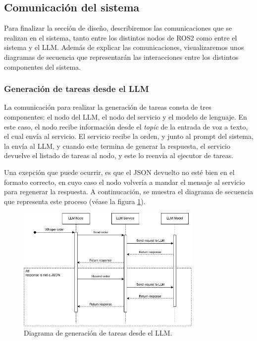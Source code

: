 \documentclass[../main.tex]{subfiles}
\begin{document}
\subsection{Comunicación del sistema}
Para finalizar la sección de diseño, describiremos las comunicaciones que se realizan en el sistema, tanto entre los distintos nodos de ROS2 como entre el sistema y el LLM. Además de explicar las comunicaciones, visualizaremos unos diagramas de secuencia que representarán las interacciones entre los distintos componentes del sistema.

\subsubsection{Generación de tareas desde el LLM}
La comunicación para realizar la generación de tareas consta de tres componentes: el nodo del LLM, el nodo del servicio y el modelo de lenguaje. En este caso, el nodo recibe información desde el \textit{topic} de la entrada de voz a texto, el cual envía al servicio. El servicio recibe la orden, y junto al prompt del sistema, la envía al LLM, y cuando este
termina de generar la respuesta, el servicio devuelve el listado de tareas al nodo, y este lo reenvia al ejecutor de tareas. 

Una exepción que puede ocurrir, es que el JSON devuelto no esté bien en el formato correcto, en cuyo caso el nodo
volvería a mandar el mensaje al servicio para regenerar la respuesta. A continucación, se muestra el diagrama de secuencia que representa este proceso (véase la figura \ref{fig:diseno_seq_llm}).

\begin{figure}[H]
    \centering
    \includegraphics[width=0.8\textwidth]{images/diseno_seq_llm.png}
    \caption{Diagrama de generación de tareas desde el LLM.}\label{fig:diseno_seq_llm}
\end{figure}
\end{document}
